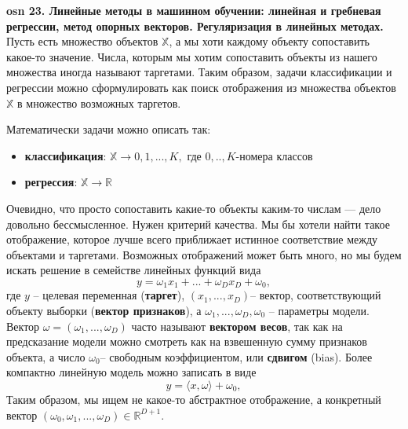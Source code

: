 

\textbf{\LARGE osn 23. Линейные методы в машинном обучении: линейная и гребневая регрессии, метод опорных векторов. Регуляризация в линейных методах. }  \\

Пусть есть множество объектов $\mathbb{X}$, а мы хоти каждому объекту сопоставить какое-то значение.
Числа, которым мы хотим сопоставить объекты из нашего множества иногда называют таргетами.
Таким образом, задачи классификации и регрессии можно сформулировать как поиск отображения из множества объектов $\mathbb{X}$ в множество возможных таргетов.

Математически задачи можно описать так:
\begin{itemize}
    \item \textbf{классификация}: $\mathbb{X} \xrightarrow{}0,1,...,K,$ где $0,..,K$-номера классов
    \item \textbf{регрессия}:  $\mathbb{X} \xrightarrow{} \mathbb{R}$
\end{itemize}
Очевидно, что просто сопоставить какие-то объекты каким-то числам — дело довольно бессмысленное. Нужен критерий качества. Мы бы хотели найти такое отображение, которое лучше всего приближает истинное соответствие между объектами и таргетами. Возможных отображений может быть много, но мы будем искать решение в семействе линейных функций вида 
\begin{equation*}
    y = \omega_1x_1+...+\omega_Dx_D+\omega_0,
\end{equation*}
где $y$ – целевая переменная (\textbf{таргет}), $(x_1,...,x_D)$– вектор, соответствующий объекту выборки (\textbf{вектор признаков}), а $\omega_1,...,\omega_D,\omega_0$ – параметры модели. Вектор $\omega=(\omega_1,...,\omega_D)$ часто называют \textbf{вектором весов}, так как на предсказание модели можно смотреть как на взвешенную сумму признаков объекта, а число $\omega_0$– свободным коэффициентом, или \textbf{сдвигом} (bias). Более компактно линейную модель можно записать в виде
\begin{equation*}
    y = \langle{x, \omega}\rangle+\omega_0,
\end{equation*}
Таким образом, мы ищем не какое-то абстрактное отображение, а конкретный вектор $(\omega_0,\omega_1,...,\omega_D) \in \mathbb{R}^{D+1}.$ \\

